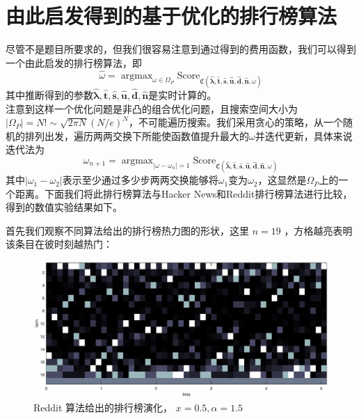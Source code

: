 \documentclass[UTF8]{ctexart}
\theoremstyle{plain}
\theoremstyle{definition}
\theoremstyle{remark}
\DeclareMathOperator*{\argmax}{argmax}
\begin{document}
	\section{由此启发得到的基于优化的排行榜算法}
	尽管不是题目所要求的，但我们很容易注意到通过得到的费用函数，我们可以得到一个由此启发的排行榜算法，即
	\begin{equation}
	\hat{\omega} = \argmax_{\omega \in \Omega_P} \mathrm{Score}_{\mathfrak{C}\left(\bm{\hat{\lambda}}, \bm{\hat{t}}, \bm{\hat{s}}, \bm{\hat{u}}, \bm{\hat{d}}, \bm{\hat{n}},\omega\right)}
	\end{equation}
	其中推断得到的参数$\bm{\hat{\lambda}}, \bm{\hat{t}}, \bm{\hat{s}}, \bm{\hat{u}}, \bm{\hat{d}}, \bm{\hat{n}}$是实时计算的。 \\
	
	注意到这样一个优化问题是非凸的组合优化问题，且搜索空间大小为$|\Omega_P| = N! \sim \sqrt{2\pi N} \left(N/e\right)^N$，不可能遍历搜索。我们采用贪心的策略，从一个随机的排列出发，遍历两两交换下所能使函数值提升最大的$\omega$并迭代更新，具体来说迭代法为
	$$
	\omega_{n+1} =  \argmax_{|\omega - \omega_n| = 1} \mathrm{Score}_{\mathfrak{C}\left(\bm{\hat{\lambda}}, \bm{\hat{t}}, \bm{\hat{s}}, \bm{\hat{u}}, \bm{\hat{d}}, \bm{\hat{n}},\omega\right)}
	$$
	其中$|\omega_1 -\omega_2|$表示至少通过多少步两两交换能够将$\omega_1$变为$\omega_2$，这显然是$\Omega_P$上的一个距离。下面我们将此排行榜算法与Hacker News和Reddit排行榜算法进行比较，得到的数值实验结果如下。
	
	首先我们观察不同算法给出的排行榜热力图的形状，这里 $n=19$ ，方格越亮表明该条目在彼时刻越热门：
	\begin{figure}[h!]
		\centering
		\includegraphics[width = \linewidth]{../model/douhu/pic/reddit-heatmap.eps}
		\caption{Reddit 算法给出的排行榜演化， $x=0.5, \alpha=1.5$}\label{fig:reddit-heatmap}
	\end{figure}
\end{document}
